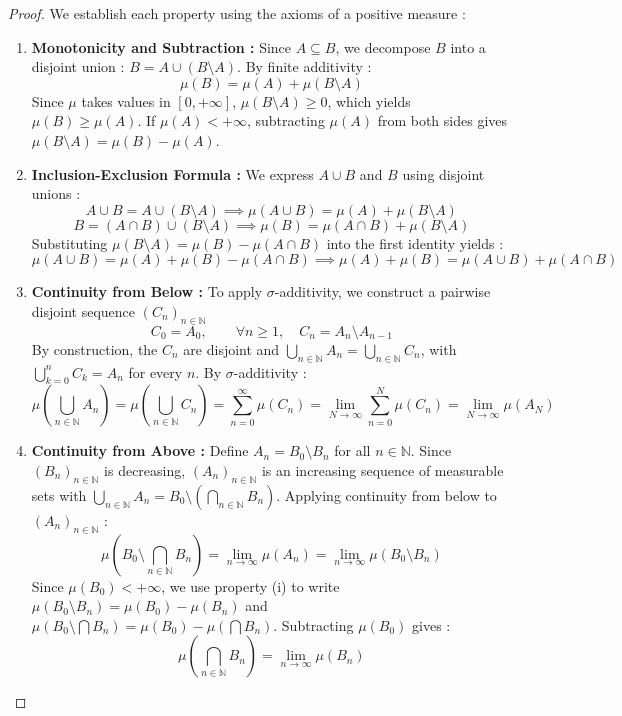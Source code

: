\begin{proof}
We establish each property using the axioms of a positive measure :

\begin{enumerate}
    \item \textbf{Monotonicity and Subtraction :}
    Since $A \subseteq B$, we decompose $B$ into a disjoint union : $B = A \cup (B \setminus A)$. By finite additivity :
    \[
        \mu(B) = \mu(A) + \mu(B \setminus A)
    \]
    Since $\mu$ takes values in $[0, +\infty]$, $\mu(B \setminus A) \ge 0$, which yields $\mu(B) \ge \mu(A)$. 
    If $\mu(A) < +\infty$, subtracting $\mu(A)$ from both sides gives $\mu(B \setminus A) = \mu(B) - \mu(A)$. 

    \item \textbf{Inclusion-Exclusion Formula :}
    We express $A \cup B$ and $B$ using disjoint unions :
    \[
        A \cup B = A \cup (B \setminus A) \implies \mu(A \cup B) = \mu(A) + \mu(B \setminus A)
    \]
    \[
        B = (A \cap B) \cup (B \setminus A) \implies \mu(B) = \mu(A \cap B) + \mu(B \setminus A)
    \]
    Substituting $\mu(B \setminus A) = \mu(B) - \mu(A \cap B)$ into the first identity yields :
    \[
        \mu(A \cup B) = \mu(A) + \mu(B) - \mu(A \cap B) \implies \mu(A) + \mu(B) = \mu(A \cup B) + \mu(A \cap B)
    \]

    \item \textbf{Continuity from Below :}
    To apply $\sigma$-additivity, we construct a pairwise disjoint sequence $(C_n)_{n \in \mathbb{N}}$ 
    \[
        C_0 = A_0, \qquad  \forall n \ge 1, \quad C_n = A_n \setminus A_{n-1} 
    \]
    By construction, the $C_n$ are disjoint and $\bigcup_{n \in \mathbb{N}} A_n = \bigcup_{n \in \mathbb{N}} C_n$, with $\bigcup_{k=0}^n C_k = A_n$ for every $n$. By $\sigma$-additivity :
    \[
        \mu\left( \bigcup_{n \in \mathbb{N}} A_n \right) = \mu\left( \bigcup_{n \in \mathbb{N}} C_n \right) = \sum_{n=0}^\infty \mu(C_n) = \lim_{N \to \infty} \sum_{n=0}^N \mu(C_n) = \lim_{N \to \infty} \mu(A_N)
    \]

    \item \textbf{Continuity from Above :}
    Define $A_n = B_0 \setminus B_n$ for all $n \in \mathbb{N}$. Since $(B_n)_{n \in \mathbb{N}}$ is decreasing, $(A_n)_{n \in \mathbb{N}}$ is an increasing sequence of measurable sets with $\bigcup_{n \in \mathbb{N}} A_n = B_0 \setminus \left( \bigcap_{n \in \mathbb{N}} B_n \right)$.
    Applying continuity from below to $(A_n)_{n \in \mathbb{N}}$ :
    \[
        \mu\left( B_0 \setminus \bigcap_{n \in \mathbb{N}} B_n \right) = \lim_{n \to \infty} \mu(A_n) = \lim_{n \to \infty} \mu(B_0 \setminus B_n)
    \]
    Since $\mu(B_0) < +\infty$, we use property (i) to write $\mu(B_0 \setminus B_n) = \mu(B_0) - \mu(B_n)$ and $\mu\left( B_0 \setminus \bigcap B_n \right) = \mu(B_0) - \mu\left( \bigcap B_n \right)$. Subtracting $\mu(B_0)$ gives :
    \[
        \mu\left( \bigcap_{n \in \mathbb{N}} B_n \right) = \lim_{n \to \infty} \mu(B_n)
    \]


\end{enumerate}
\end{proof}
